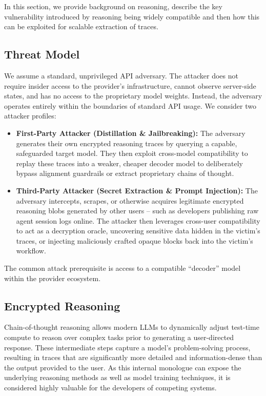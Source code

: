 
In this section, we provide background on reasoning, describe the key vulnerability introduced by reasoning being widely compatible and then how this can be exploited for scalable extraction of traces.

\subsection{Threat Model}
We assume a standard, unprivileged API adversary. The attacker does not require insider access to the provider’s infrastructure, cannot observe server-side states, and has no access to the proprietary model weights. Instead, the adversary operates entirely within the boundaries of standard API usage. We consider two attacker profiles:
\begin{itemize}
    \item \textbf{First-Party Attacker (Distillation \& Jailbreaking):} The adversary generates their own encrypted reasoning traces by querying a capable, safeguarded target model. They then exploit cross-model compatibility to replay these traces into a weaker, cheaper decoder model to deliberately bypass alignment guardrails or extract proprietary chains of thought. 
    \item \textbf{Third-Party Attacker (Secret Extraction \& Prompt Injection):} The adversary intercepts, scrapes, or otherwise acquires legitimate encrypted reasoning blobs generated by other users -- such as developers publishing raw agent session logs online. The attacker then leverages cross-user compatibility to act as a decryption oracle, uncovering sensitive data hidden in the victim's traces, or injecting maliciously crafted opaque blocks back into the victim's workflow.  
\end{itemize}
    
The common attack prerequisite is access to a compatible ``decoder'' model within the provider ecosystem.

\subsection{Encrypted Reasoning}
\label{sec:vuln_mechanism}

Chain-of-thought reasoning \citep{wei2022chain, jaech2024openai} allows modern LLMs to dynamically adjust test-time compute to reason over complex tasks prior to generating a user-directed response. These intermediate steps capture a model's problem-solving process, resulting in traces that are significantly more detailed and information-dense than the output provided to the user. As this internal monologue can expose the underlying reasoning methods as well as model training techniques, it is considered highly valuable for the developers of competing systems.

